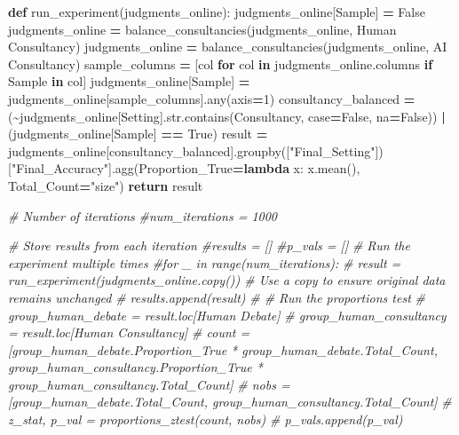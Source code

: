 \documentclass[
]{article}
\newenvironment{Shaded}{\begin{snugshade}}{\end{snugshade}}
\newcommand{\BuiltInTok}[1]{#1}
\newcommand{\CommentTok}[1]{\textcolor[rgb]{0.56,0.35,0.01}{\textit{#1}}}
\newcommand{\ControlFlowTok}[1]{\textcolor[rgb]{0.13,0.29,0.53}{\textbf{#1}}}
\newcommand{\DecValTok}[1]{\textcolor[rgb]{0.00,0.00,0.81}{#1}}
\newcommand{\KeywordTok}[1]{\textcolor[rgb]{0.13,0.29,0.53}{\textbf{#1}}}
\newcommand{\NormalTok}[1]{#1}
\newcommand{\OperatorTok}[1]{\textcolor[rgb]{0.81,0.36,0.00}{\textbf{#1}}}
\newcommand{\StringTok}[1]{\textcolor[rgb]{0.31,0.60,0.02}{#1}}
\newcommand{\VariableTok}[1]{\textcolor[rgb]{0.00,0.00,0.00}{#1}}
\begin{document}
\begin{Shaded}
\begin{Highlighting}[]
\KeywordTok{def}\NormalTok{ run\_experiment(judgments\_online):}
\NormalTok{    judgments\_online[}\StringTok{\textquotesingle{}Sample\textquotesingle{}}\NormalTok{] }\OperatorTok{=} \VariableTok{False}
\NormalTok{    judgments\_online }\OperatorTok{=}\NormalTok{ balance\_consultancies(judgments\_online, }\StringTok{\textquotesingle{}Human Consultancy\textquotesingle{}}\NormalTok{)}
\NormalTok{    judgments\_online }\OperatorTok{=}\NormalTok{ balance\_consultancies(judgments\_online, }\StringTok{\textquotesingle{}AI Consultancy\textquotesingle{}}\NormalTok{)}
\NormalTok{    sample\_columns }\OperatorTok{=}\NormalTok{ [col }\ControlFlowTok{for}\NormalTok{ col }\KeywordTok{in}\NormalTok{ judgments\_online.columns }\ControlFlowTok{if} \StringTok{\textquotesingle{}Sample\textquotesingle{}} \KeywordTok{in}\NormalTok{ col]}
\NormalTok{    judgments\_online[}\StringTok{\textquotesingle{}Sample\textquotesingle{}}\NormalTok{] }\OperatorTok{=}\NormalTok{ judgments\_online[sample\_columns].}\BuiltInTok{any}\NormalTok{(axis}\OperatorTok{=}\DecValTok{1}\NormalTok{)}
\NormalTok{    consultancy\_balanced }\OperatorTok{=}\NormalTok{ (}\OperatorTok{\textasciitilde{}}\NormalTok{judgments\_online[}\StringTok{\textquotesingle{}Setting\textquotesingle{}}\NormalTok{].}\BuiltInTok{str}\NormalTok{.contains(}\StringTok{\textquotesingle{}Consultancy\textquotesingle{}}\NormalTok{, case}\OperatorTok{=}\VariableTok{False}\NormalTok{, na}\OperatorTok{=}\VariableTok{False}\NormalTok{)) }\OperatorTok{|}\NormalTok{ (judgments\_online[}\StringTok{\textquotesingle{}Sample\textquotesingle{}}\NormalTok{] }\OperatorTok{==} \VariableTok{True}\NormalTok{)}
\NormalTok{    result }\OperatorTok{=}\NormalTok{ judgments\_online[consultancy\_balanced].groupby([}\StringTok{"Final\_Setting"}\NormalTok{])[}\StringTok{"Final\_Accuracy"}\NormalTok{].agg(Proportion\_True}\OperatorTok{=}\KeywordTok{lambda}\NormalTok{ x: x.mean(), Total\_Count}\OperatorTok{=}\StringTok{"size"}\NormalTok{)}
    \ControlFlowTok{return}\NormalTok{ result}

\CommentTok{\# Number of iterations}
\CommentTok{\#num\_iterations = 1000}

\CommentTok{\# Store results from each iteration}
\CommentTok{\#results = []}
\CommentTok{\#p\_vals = []}
\CommentTok{\# Run the experiment multiple times}
\CommentTok{\#for \_ in range(num\_iterations):}
\CommentTok{\#    result = run\_experiment(judgments\_online.copy())  \# Use a copy to ensure original data remains unchanged}
\CommentTok{\#    results.append(result)}
\CommentTok{\#    \# Run the proportions test}
\CommentTok{\#    group\_human\_debate = result.loc[\textquotesingle{}Human Debate\textquotesingle{}]}
\CommentTok{\#    group\_human\_consultancy = result.loc[\textquotesingle{}Human Consultancy\textquotesingle{}]}
\CommentTok{\#    count = [group\_human\_debate.Proportion\_True * group\_human\_debate.Total\_Count, group\_human\_consultancy.Proportion\_True * group\_human\_consultancy.Total\_Count]}
\CommentTok{\#    nobs = [group\_human\_debate.Total\_Count, group\_human\_consultancy.Total\_Count]}
\CommentTok{\#    z\_stat, p\_val = proportions\_ztest(count, nobs)}
\CommentTok{\#    p\_vals.append(p\_val)}


\end{Highlighting}
\end{Shaded}
\end{document}
